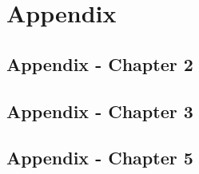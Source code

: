 \documentclass[a4paper,12pt,oneside]{memoir}
\begin{document}
\setcounter{chapter}{1}
\appendix
{}
\chapter{Appendix}

  \section{Appendix - Chapter 2}
  \setcounter{figure}{0} \renewcommand{\thefigure}{A.2.\arabic{figure}} 
  \setcounter{table}{0} \renewcommand{\thetable}{A.2.\arabic{table}}
  
  \clearpage
  
  \section{Appendix - Chapter 3}
  \setcounter{figure}{0} \renewcommand{\thefigure}{A.3.\arabic{figure}} 
  \setcounter{table}{0} \renewcommand{\thetable}{A.3.\arabic{table}}
  
  \clearpage
  
  \section{Appendix - Chapter 5}
  \setcounter{figure}{0} \renewcommand{\thefigure}{A.5.\arabic{figure}} 
  \setcounter{table}{0} \renewcommand{\thetable}{A.5.\arabic{table}}
  
  \clearpage

\end{document}
